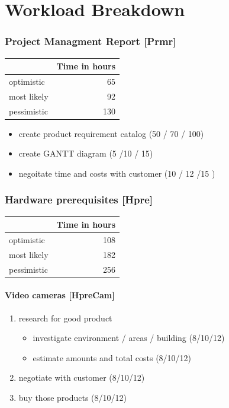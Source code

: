 \chapter{Workload Breakdown}
\subsection{Project Managment Report [Prmr]}
\label{sec:orgd96ec13}
\begin{center}
\begin{tabular}{|l|r|}
	\hline
	 & Time in hours\\
	 \hline
	optimistic & 65\\
	\hline
	most likely & 92\\
	\hline
	pessimistic & 130\\
	\hline
\end{tabular}
\end{center}
\begin{itemize}
\item create product requirement catalog (50 / 70 / 100)
\item create GANTT diagram (5 /10 / 15)
\item negoitate time and costs with customer (10 / 12 /15 )
\end{itemize}

\subsection{Hardware prerequisites [Hpre]}
\label{sec:orgfb33f5b}

\begin{center}
	\begin{tabular}{|l|r|}
		\hline
		& Time in hours\\
		\hline
		optimistic & 108\\
		\hline
		most likely & 182\\
		\hline
		pessimistic & 256\\
		\hline
	\end{tabular}
\end{center}


\subsubsection{Video cameras [HpreCam]}
\label{sec:org3a27049}
	\begin{enumerate}
	\item research for good product
	\begin{itemize}
	\item investigate environment / areas / building (8/10/12)
	\item estimate amounts and total costs (8/10/12)
	\end{itemize}
	\item negotiate with customer (8/10/12)
	\item buy those products (8/10/12)
	\end{enumerate}

